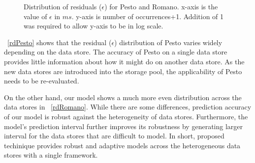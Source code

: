 \begin{figure}[!t]
\centering
{}
\caption{Distribution of residuals ($\epsilon$) for Pesto and Romano.
x-axis is the value of $\epsilon$ in $ms$.
y-axis is number of occurrences+1.
Addition of 1 was required to allow y-axis to be in log scale.
}
\label{residualDist}
\end{figure}
\figurename~\ref{rdPesto} shows that the residual ($\epsilon$) distribution of Pesto varies widely depending on the data store.
The accuracy of Pesto on a single data store provides little information about how it might do on another data store.
As the new data stores are introduced into the storage pool, the applicability of Pesto needs to be re-evaluated.

On the other hand, our model shows a much more even distribution across the data stores in \figurename~\ref{rdRomano}.
While there are some differences, prediction accuracy of our model is robust against the heterogeneity of data stores.
Furthermore, the model's prediction interval further improves its robustness by generating larger interval for the data stores that are difficult to model.
In short, proposed techinique provides robust and adaptive models across the heterogeneous data stores with a single framework.


